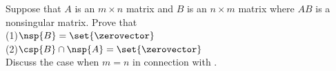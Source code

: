 Suppose that $A$ is an $m\times n$ matrix and $B$ is an $n\times m$ matrix where $AB$ is a nonsingular matrix.  Prove that \\
(1)\quad$\nsp{B}=\set{\zerovector}$\\
(2)\quad$\csp{B}\cap\nsp{A}=\set{\zerovector}$\\
Discuss the case when $m=n$ in connection with .
